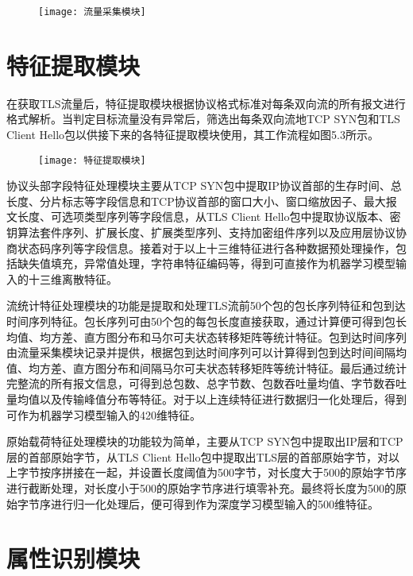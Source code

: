 \begin{figure}[!h]
    \centering
    \texttt{[image: 流量采集模块]}
    \label{fig:5-2}
\end{figure}

\section{特征提取模块}

在获取TLS流量后，特征提取模块根据协议格式标准对每条双向流的所有报文进行格式解析。当判定目标流量没有异常后，筛选出每条双向流地TCP SYN包和TLS Client Hello包以供接下来的各特征提取模块使用，其工作流程如图5.3所示。

\begin{figure}[!htbp]
    \centering
    \texttt{[image: 特征提取模块]}
    \label{fig:5-2}
\end{figure}

协议头部字段特征处理模块主要从TCP SYN包中提取IP协议首部的生存时间、总长度、分片标志等字段信息和TCP协议首部的窗口大小、窗口缩放因子、最大报文长度、可选项类型序列等字段信息，从TLS Client Hello包中提取协议版本、密钥算法套件序列、扩展长度、扩展类型序列、支持加密组件序列以及应用层协议协商状态码序列等字段信息。接着对于以上十三维特征进行各种数据预处理操作，包括缺失值填充，异常值处理，字符串特征编码等，得到可直接作为机器学习模型输入的十三维离散特征。

流统计特征处理模块的功能是提取和处理TLS流前50个包的包长序列特征和包到达时间序列特征。包长序列可由50个包的每包长度直接获取，通过计算便可得到包长均值、均方差、直方图分布和马尔可夫状态转移矩阵等统计特征。包到达时间序列由流量采集模块记录并提供，根据包到达时间序列可以计算得到包到达时间间隔均值、均方差、直方图分布和间隔马尔可夫状态转移矩阵等统计特征。最后通过统计完整流的所有报文信息，可得到总包数、总字节数、包数吞吐量均值、字节数吞吐量均值以及传输峰值分布等特征。对于以上连续特征进行数据归一化处理后，得到可作为机器学习模型输入的420维特征。

原始载荷特征处理模块的功能较为简单，主要从TCP SYN包中提取出IP层和TCP层的首部原始字节，从TLS Client Hello包中提取出TLS层的首部原始字节，对以上字节按序拼接在一起，并设置长度阈值为500字节，对长度大于500的原始字节序进行截断处理，对长度小于500的原始字节序进行填零补充。最终将长度为500的原始字节序进行归一化处理后，便可得到作为深度学习模型输入的500维特征。

\section{属性识别模块}

